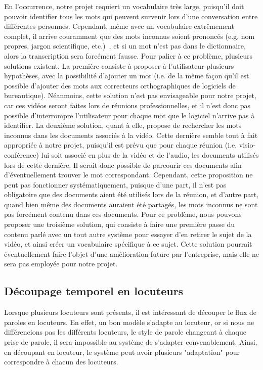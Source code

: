 	En l'occurrence, notre projet requiert un vocabulaire très large, puisqu'il doit pouvoir identifier tous les mots qui peuvent survenir lors d'une conversation entre différentes personnes. Cependant, même avec un vocabulaire extrêmement complet, il arrive couramment que des mots inconnus soient prononcés (e.g. nom propres, jargon scientifique, etc.)~\cite{retrieval-browsing-spoken-content}, et si un mot n'est pas dans le dictionnaire, alors la transcription sera forcément fausse. Pour palier à ce problème, plusieurs solutions existent. La première consiste à proposer à l'utilisateur plusieurs hypothèses, avec la possibilité d'ajouter un mot (i.e. de la même façon qu'il est possible d'ajouter des mots aux correcteurs orthographiques de logiciels de bureautique). Néanmoins, cette solution n'est pas envisageable pour notre projet, car ces vidéos seront faites lors de réunions professionnelles, et il n'est donc pas possible d'interrompre l'utilisateur pour chaque mot que le logiciel n'arrive pas à identifier. La deuxième solution, quant à elle, propose de rechercher les mots inconnus dans les documents associés à la vidéo. Cette dernière semble tout à fait appropriée à notre projet, puisqu'il est prévu que pour chaque réunion (i.e. visio-conférence) lui soit associé en plus de la vidéo et de l'audio, les documents utilisés lors de cette dernière. Il serait donc possible de parcourir ces documents afin d'éventuellement trouver le mot correspondant. Cependant, cette proposition ne peut pas fonctionner systématiquement, puisque d'une part, il n'est pas obligatoire que des documents aient été utilisés lors de la réunion, et d'autre part, quand bien même des documents auraient été partagés, les mots inconnus ne sont pas forcément contenu dans ces documents. Pour ce problème, nous pouvons proposer une troisième solution, qui consiste à faire une première passe du contenu parlé avec un tout autre système pour essayer d'en retirer le sujet de la vidéo, et ainsi créer un vocabulaire spécifique à ce sujet. Cette solution pourrait éventuellement faire l'objet d'une amélioration future par l'entreprise, mais elle ne sera pas employée pour notre projet.
	
	
	\subsection{Découpage temporel en locuteurs}
	Lorsque plusieurs locuteurs sont présents, il est intéressant de découper le flux de paroles en locuteurs. En effet, un bon modèle s'adapte au locuteur, or si nous ne différencions pas les différents locuteurs, le style de parole changeant à chaque prise de parole, il sera impossible au système de s'adapter convenablement. Ainsi, en découpant en locuteur, le système peut avoir plusieurs "adaptation" pour correspondre à chacun des locuteurs.
	
